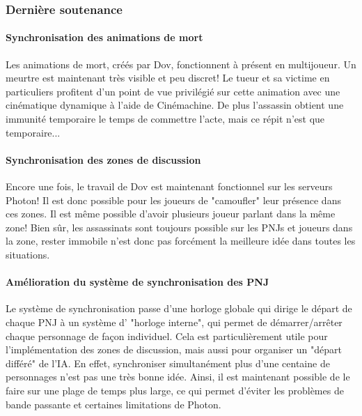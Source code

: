     \subsubsection{Dernière soutenance}

        \paragraph{Synchronisation des animations de mort}
			
			Les animations de mort, créés par Dov, fonctionnent à présent en multijoueur. Un meurtre est maintenant très visible et peu discret!
			Le tueur et sa victime en particuliers profitent d'un point de vue privilégié sur cette animation avec une cinématique dynamique à l'aide de Cinémachine.
			De plus l'assassin obtient une immunité temporaire le temps de commettre l'acte, mais ce répit n'est que temporaire...
			
		\paragraph{Synchronisation des zones de discussion}
			
			Encore une fois, le travail de Dov est maintenant fonctionnel sur les serveurs Photon! Il est donc possible pour les joueurs de "camoufler" leur présence dans ces zones.
			Il est même possible d'avoir plusieurs joueur parlant dans la même zone! Bien sûr, les assassinats sont toujours possible sur les PNJs et joueurs dans la zone, rester immobile
			n'est donc pas forcément la meilleure idée dans toutes les situations.
			
	    \paragraph{Amélioration du système de synchronisation des PNJ}
			
			Le système de synchronisation passe d'une horloge globale qui dirige le départ de chaque PNJ à un système d' "horloge interne", qui permet de démarrer/arrêter
			chaque personnage de façon individuel. Cela est particulièrement utile pour l'implémentation des zones de discussion, mais aussi pour organiser un "départ différé" de l'IA.
			En effet, synchroniser simultanément plus d'une centaine de personnages n'est pas une très bonne idée. Ainsi, il est maintenant possible de le faire sur une plage de temps
			plus large, ce qui permet d'éviter les problèmes de bande passante et certaines limitations de Photon.
		
